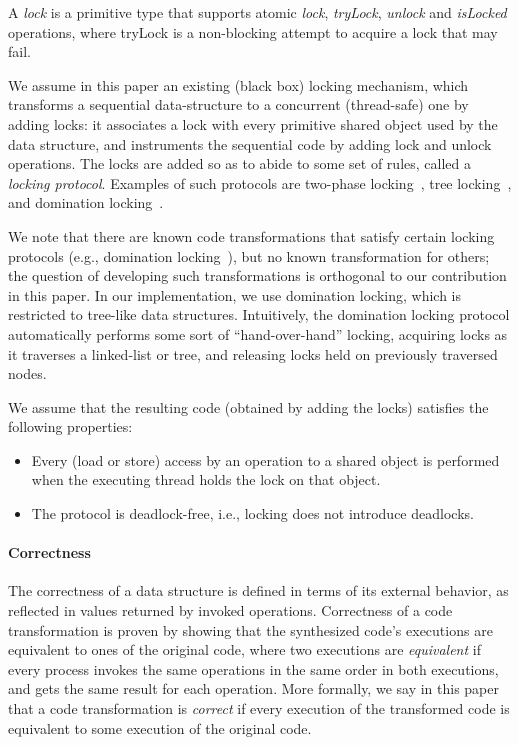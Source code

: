 A \emph{lock} is a primitive type that supports atomic \emph{lock},
\emph{tryLock}, \emph{unlock} and \emph{isLocked} operations, where tryLock is a
non-blocking attempt to acquire a lock that may fail.

We assume in this paper an existing (black box) locking mechanism, which transforms a sequential data-structure to a concurrent (thread-safe)
one by adding locks:
it associates a lock with every primitive shared object used by the data structure, and instruments the sequential code 
by adding lock and unlock operations. 
The locks are added so as to abide to some set of rules, called a \emph{locking protocol}. 
Examples of such protocols are two-phase locking~\cite{2pl}, tree locking~\cite{SilberschatzK1980}, and domination locking~\cite{Gueta2011}. 

We note that there are known code transformations that satisfy certain locking protocols (e.g., domination locking~\cite{Gueta2011}), but no known
transformation for others; the question of developing such transformations is orthogonal to our contribution in this paper. 
In our implementation, we use domination locking, which is restricted to tree-like data structures.
Intuitively, the domination locking protocol automatically performs some sort of ``hand-over-hand'' locking, acquiring locks as
it traverses a linked-list or tree, and releasing locks held on previously traversed nodes. 

We assume that the resulting code (obtained by adding the locks) satisfies the following properties:
\begin{itemize}
\item Every (load or store) access by an operation to a shared object is performed when the executing thread holds the lock on that object.
\item The protocol is deadlock-free, i.e., locking does not introduce deadlocks.
\end{itemize}

\paragraph{Correctness}

The correctness of a data structure is defined in terms of its external behavior, as reflected in values returned by invoked operations. 
Correctness of a code transformation is proven by showing that the synthesized code's executions are equivalent to ones of the original code, 
where two executions are  \emph{equivalent} if every process invokes the same operations in the same order  in both executions, and gets the
same result for each operation. More formally, we say in this paper that a code transformation is \emph{correct} if every execution of the transformed code
is equivalent to some execution of the original code.

